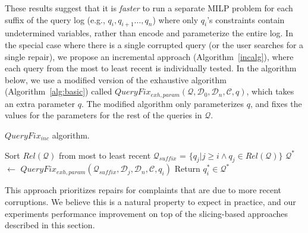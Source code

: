 These results suggest that it is {\it faster} to run a separate MILP problem for each 
suffix of the query log (e.g., $q_i, q_{i+1}\ldots, q_n$) where only $q_i$'s constraints contain
undetermined variables, rather than encode and parameterize the entire log.
In the special case where there is a single corrupted query (or the user searches for a single repair),
we propose an incremental approach (Algorithm~\ref{incalg}), 
where each query from the most to least recent is individually tested.
In the algorithm below, we use a modified version of the exhaustive algorithm 
(Algorithm~\ref{alg:basic}) called $QueryFix_{exh,param}(\mathcal{Q}, \mathcal{D}_0, \mathcal{D}_n, \mathcal{C}, q)$,
which takes an extra parameter $q$.  The modified algorithm only parameterizes $q$, 
and fixes the values for the parameters for the rest of the queries in $\mathcal{Q}$.

\begin{algorithm}[htbp]
\caption{$QueryFix_{inc}$ algorithm.}
\label{alg:incalg}
\begin{algorithmic}
\STATE Sort $Rel\mathcal{(Q)}$ from most to least recent
  \STATE $\mathcal{Q}_{suffix}$ = $\{q_j | j \ge i \wedge q_j \in Rel\mathcal{(Q)}\}$
  \STATE $\mathcal{Q}^*$ $\leftarrow$ $QueryFix_{exh,param}(\mathcal{Q}_{suffix}, \mathcal{D}_j, \mathcal{D}_n, \mathcal{C}, q_i)$
    \STATE Return $q_i^* \in \mathcal{Q}^*$
  \ENDIF
\ENDFOR
\end{algorithmic}
\end{algorithm}



This approach prioritizes repairs for complaints that are due to more recent corruptions.
We believe this is a natural property to expect in practice, and our experiments 
performance improvement on top of the slicing-based approaches described in this section.

